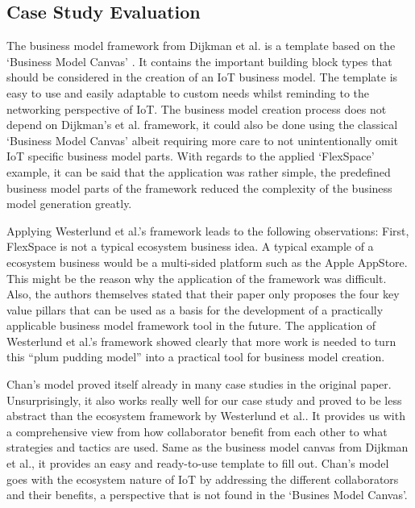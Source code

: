 	\subsection{Case Study Evaluation}
		The business model framework from Dijkman et al. \cite{dijkman} is a template based on the `Business Model Canvas' \cite{bmc}. It contains the important building block types that should be considered in the creation of an IoT business model. The template is easy to use and easily adaptable to custom needs whilst reminding to the networking perspective of IoT. The business model creation process does not depend on Dijkman's et al. framework, it could also be done using the classical `Business Model Canvas' albeit requiring more care to not unintentionally omit IoT specific business model parts.
		With regards to the applied `FlexSpace' example, it can be said that the application was rather simple, the predefined business model parts of the framework reduced the complexity of the business model generation greatly.

		Applying Westerlund et al.'s framework leads to the following observations: First, FlexSpace is not a typical ecosystem business idea. A typical example of a ecosystem business would be a multi-sided platform such as the Apple AppStore. This might be the reason why the application of the framework was difficult. Also, the authors themselves stated that their paper only proposes the four key value pillars that can be used as a basis for the development of a practically applicable business model framework tool in the future. The application of Westerlund et al.'s framework showed clearly that more work is needed to turn this ``plum pudding model'' \cite[p. 10]{westerlund} into a practical tool for business model creation.

		Chan's model proved itself already in many case studies in the original paper. Unsurprisingly, it also works really well for our case study and proved to be less abstract than the ecosystem framework by Westerlund et al.. It provides us with a comprehensive view from how collaborator benefit from each other to what strategies and tactics are used. Same as the business model canvas from Dijkman et al., it provides an easy and ready-to-use template to fill out. Chan's model goes with the ecosystem nature of IoT by addressing the different collaborators and their benefits, a perspective that is not found in the `Busines Model Canvas'.

